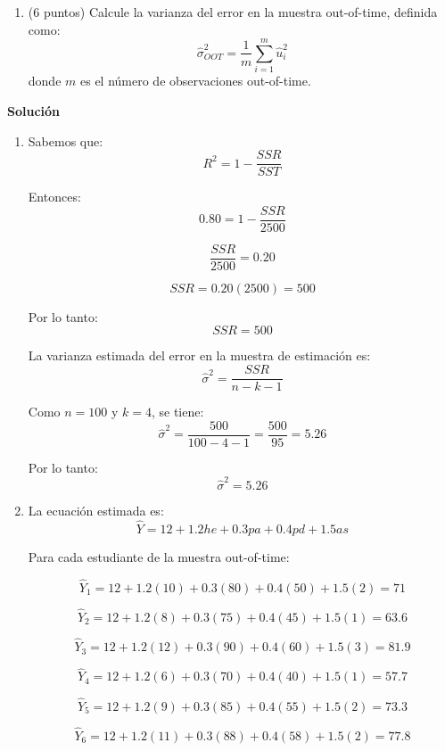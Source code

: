 \documentclass[10pt,a4paper]{article}
\begin{document}
\begin{enumerate}
\begin{enumerate}
        Calcule el valor predicho \(\hat Y\) para cada estudiante de la muestra out-of-time. 
        \item (6 puntos) Calcule la varianza del error en la muestra out-of-time, definida como:
        \[
        \hat\sigma^2_{OOT}=\frac{1}{m}\sum_{i=1}^{m}\hat u_i^2
        \]
        donde \(m\) es el número de observaciones out-of-time.
    \end{enumerate}

    \textbf{Solución}

    \begin{enumerate}
        \item Sabemos que:
        \[
        R^2=1-\frac{SSR}{SST}
        \]

        Entonces:
        \[
        0.80 = 1-\frac{SSR}{2500}
        \]

        \[
        \frac{SSR}{2500}=0.20
        \]

        \[
        SSR=0.20(2500)=500
        \]

        Por lo tanto:
        \[
        \boxed{SSR=500}
        \]

         La varianza estimada del error en la muestra de estimación es:
        \[
        \hat\sigma^2=\frac{SSR}{n-k-1}
        \]

        Como \(n=100\) y \(k=4\), se tiene:
        \[
        \hat\sigma^2=\frac{500}{100-4-1}=\frac{500}{95}=5.26
        \]

        Por lo tanto:
        \[
        \boxed{\hat\sigma^2=5.26}
        \]

        \item La ecuación estimada es:
        \[
        \hat Y = 12 + 1.2he + 0.3pa + 0.4pd + 1.5as
        \]

        Para cada estudiante de la muestra out-of-time:

        \[
        \hat Y_1=12+1.2(10)+0.3(80)+0.4(50)+1.5(2)=71
        \]

        \[
        \hat Y_2=12+1.2(8)+0.3(75)+0.4(45)+1.5(1)=63.6
        \]

        \[
        \hat Y_3=12+1.2(12)+0.3(90)+0.4(60)+1.5(3)=81.9
        \]

        \[
        \hat Y_4=12+1.2(6)+0.3(70)+0.4(40)+1.5(1)=57.7
        \]

        \[
        \hat Y_5=12+1.2(9)+0.3(85)+0.4(55)+1.5(2)=73.3
        \]

        \[
        \hat Y_6=12+1.2(11)+0.3(88)+0.4(58)+1.5(2)=77.8
        \]


\end{enumerate}
\end{enumerate}
\end{document}
